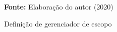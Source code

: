 \begin{figure}[ht!]
\centering

\caption{\textmd{Definição de gerenciador de escopo}}
\label{fig:scoperef}

\par\medskip\textbf{Fonte:} Elaboração do autor (2020) \par\medskip

\end{figure}

